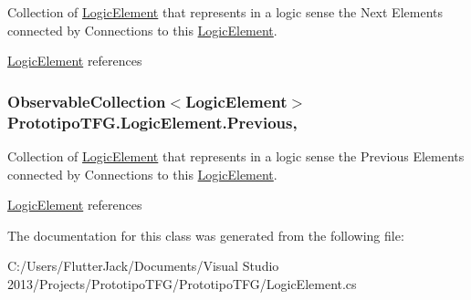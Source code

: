 Collection of \hyperlink{class_prototipo_t_f_g_1_1_logic_element}{Logic\+Element} that represents in a logic sense the Next Elements connected by Connections to this \hyperlink{class_prototipo_t_f_g_1_1_logic_element}{Logic\+Element}. 

\hyperlink{class_prototipo_t_f_g_1_1_logic_element}{Logic\+Element} references\hypertarget{class_prototipo_t_f_g_1_1_logic_element_a7f4726fd57b4d6ae46f81da0cbc491d0}{}
\subsubsection[{Previous}]{\setlength{\rightskip}{0pt plus 5cm}Observable\+Collection$<${\bf Logic\+Element}$>$ Prototipo\+T\+F\+G.\+Logic\+Element.\+Previous\hspace{0.3cm}{\ttfamily [get]}, {\ttfamily [set]}}\label{class_prototipo_t_f_g_1_1_logic_element_a7f4726fd57b4d6ae46f81da0cbc491d0}


Collection of \hyperlink{class_prototipo_t_f_g_1_1_logic_element}{Logic\+Element} that represents in a logic sense the Previous Elements connected by Connections to this \hyperlink{class_prototipo_t_f_g_1_1_logic_element}{Logic\+Element}. 

\hyperlink{class_prototipo_t_f_g_1_1_logic_element}{Logic\+Element} references

The documentation for this class was generated from the following file\+:\begin{DoxyCompactItemize}
\item 
C\+:/\+Users/\+Flutter\+Jack/\+Documents/\+Visual Studio 2013/\+Projects/\+Prototipo\+T\+F\+G/\+Prototipo\+T\+F\+G/Logic\+Element.\+cs\end{DoxyCompactItemize}
